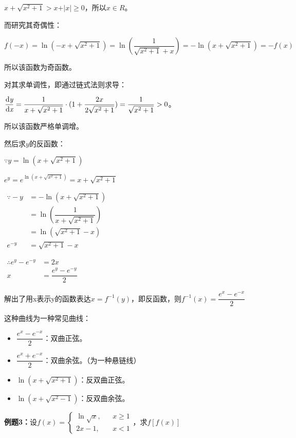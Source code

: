 \documentclass[UTF8, 12pt]{ctexart}
\begin{document}
$x+\sqrt{x^2+1}>x+\vert x\vert \geqslant 0$，所以$x\in R$。

而研究其奇偶性：

$f(-x)=\ln(-x+\sqrt{x^2+1})=\ln(\dfrac{1}{\sqrt{x^2+1}+x})=-\ln(x+\sqrt{x^2+1})=-f(x)$

所以该函数为奇函数。

对其求单调性，即通过链式法则求导：

$\dfrac{\rm{d}\textit{y}}{\rm{d}\textit{x}}=\dfrac{1}{x+\sqrt{x^2+1}}\cdot (1+\dfrac{2x}{2\sqrt{x^2+1}})=\dfrac{1}{\sqrt{x^2+1}}>0$。\medskip

所以该函数严格单调增。

然后求$y$的反函数：

$\because y=\ln(x+\sqrt{x^2+1})$

$e^y=e^{\ln(x+\sqrt{x^2+1})}=x+\sqrt{x^2+1}$

$
    \begin{aligned}
        \because -y & =-\ln(x+\sqrt{x^2+1})          \\
                    & =\ln(\dfrac{1}{x+\sqrt{x^2+1}}) \\
                    & =\ln(\sqrt{x^2+1}-x)           \\
        e^{-y}      & =\sqrt{x^2+1}-x
    \end{aligned}
$

$
    \begin{aligned}
        \therefore e^y-e^{-y} & =2x                   \\
        x                     & =\dfrac{e^y-e^{-y}}{2}
    \end{aligned}
$

解出了用x表示y的函数表达$x=f^{-1}(y)$，即反函数，则$f^{-1}(x)=\dfrac{e^x-e^{-x}}{2}$

这种曲线为一种常见曲线：

\begin{itemize}
    \item $\dfrac{e^x-e^{-x}}{2}$：双曲正弦。
    \item $\dfrac{e^x+e^{-x}}{2}$：双曲余弦。（为一种悬链线）
    \item $\ln(x+\sqrt{x^2+1})$：反双曲正弦。
    \item $\ln(x+\sqrt{x^2-1})$：反双曲余弦。
\end{itemize}

\textbf{例题3：}设$
    f(x)=\left\{
    \begin{array}{lcl}
        \ln\sqrt{x}, &  & x\geqslant 1 \\
        2x-1,        &  & x< 1
    \end{array}
    \right.
$，求$f[f(x)]$
\end{document}

